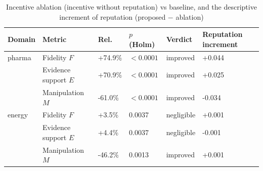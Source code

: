 \begin{table}[t]
\caption{Incentive ablation (incentive without reputation) vs baseline, and the descriptive increment of reputation (proposed $-$ ablation)}\label{tab:ablation}
\footnotesize
\begin{tabular}{@{}llllll@{}}
\toprule
Domain & Metric & Rel. & $p$ (Holm) & Verdict & Reputation increment \\
\midrule
pharma & Fidelity $F$ & +74.9\% & $<0.0001$ & improved & +0.044 \\
 & Evidence support $E$ & +70.9\% & $<0.0001$ & improved & +0.025 \\
 & Manipulation $M$ & -61.0\% & $<0.0001$ & improved & -0.034 \\
energy & Fidelity $F$ & +3.5\% & 0.0037 & negligible & +0.001 \\
 & Evidence support $E$ & +4.4\% & 0.0037 & negligible & -0.001 \\
 & Manipulation $M$ & -46.2\% & 0.0013 & improved & +0.001 \\
\bottomrule
\end{tabular}
\end{table}
